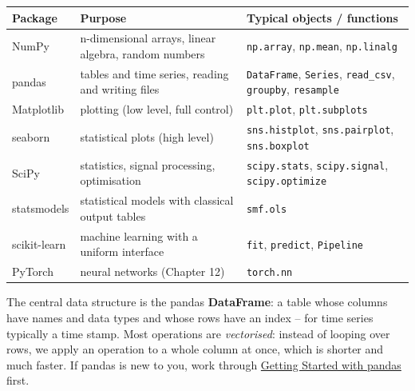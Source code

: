 \documentclass[
  letterpaper,
  DIV=11,
  numbers=noendperiod]{scrreprt}
\begin{document}
\begin{longtable}[]{@{}
  >{\raggedright\arraybackslash}p{}
  >{\raggedright\arraybackslash}p{}
  >{\raggedright\arraybackslash}p{}@{}}
\toprule\noalign{}
\begin{minipage}[b]{\linewidth}\raggedright
Package
\end{minipage} & \begin{minipage}[b]{\linewidth}\raggedright
Purpose
\end{minipage} & \begin{minipage}[b]{\linewidth}\raggedright
Typical objects / functions
\end{minipage} \\
\midrule\noalign{}
\endhead
\bottomrule\noalign{}
\endlastfoot
NumPy & n-dimensional arrays, linear algebra, random numbers &
\texttt{np.array}, \texttt{np.mean}, \texttt{np.linalg} \\
pandas & tables and time series, reading and writing files &
\texttt{DataFrame}, \texttt{Series}, \texttt{read\_csv},
\texttt{groupby}, \texttt{resample} \\
Matplotlib & plotting (low level, full control) & \texttt{plt.plot},
\texttt{plt.subplots} \\
seaborn & statistical plots (high level) & \texttt{sns.histplot},
\texttt{sns.pairplot}, \texttt{sns.boxplot} \\
SciPy & statistics, signal processing, optimisation &
\texttt{scipy.stats}, \texttt{scipy.signal}, \texttt{scipy.optimize} \\
statsmodels & statistical models with classical output tables &
\texttt{smf.ols} \\
scikit-learn & machine learning with a uniform interface & \texttt{fit},
\texttt{predict}, \texttt{Pipeline} \\
PyTorch & neural networks (Chapter 12) & \texttt{torch.nn} \\
\end{longtable}

The central data structure is the pandas \textbf{DataFrame}: a table
whose columns have names and data types and whose rows have an index --
for time series typically a time stamp. Most operations are
\emph{vectorised}: instead of looping over rows, we apply an operation
to a whole column at once, which is shorter and much faster. If pandas
is new to you, work through \href{00-pandas.ipynb}{Getting Started with
pandas} first.
\end{document}

